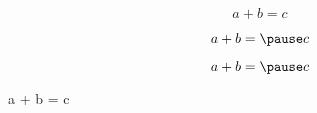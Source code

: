 \documentclass[beamer]{standalone}
\begin{document}
\begin{frame}
  \begin{theorem}[No Pause]
	\[
	  a + b = c
	\]
  \end{theorem}

  \begin{theorem}
	\[
	  a + b = \pause c
	\]
  \end{theorem}

  \begin{theorem}
	\[
	  a + b = \pause c
	\]
	\vspace{-0.60cm}
  \end{theorem}

  \begin{theorem}
	a + b = \pause c
  \end{theorem}
\end{frame}
\end{document}
